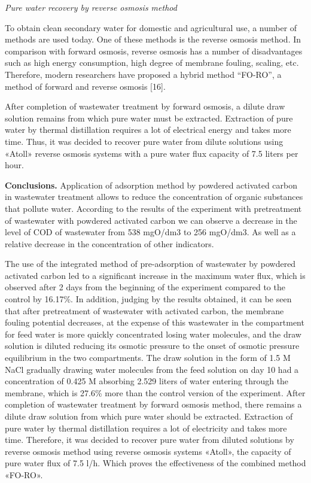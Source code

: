 \emph{Pure water recovery by reverse osmosis method}

To obtain clean secondary water for domestic and agricultural use, a
number of methods are used today. One of these methods is the reverse
osmosis method. In comparison with forward osmosis, reverse osmosis has
a number of disadvantages such as high energy consumption, high degree
of membrane fouling, scaling, etc. Therefore, modern researchers have
proposed a hybrid method ``FO-RO'', a method of forward and reverse
osmosis {[}16{]}.

After completion of wastewater treatment by forward osmosis, a dilute
draw solution remains from which pure water must be extracted.
Extraction of pure water by thermal distillation requires a lot of
electrical energy and takes more time. Thus, it was decided to recover
pure water from dilute solutions using «Atoll» reverse osmosis systems
with a pure water flux capacity of 7.5 liters per hour.

{\bfseries Conclusions.} Application of adsorption method by powdered
activated carbon in wastewater treatment allows to reduce the
concentration of organic substances that pollute water. According to the
results of the experiment with pretreatment of wastewater with powdered
activated carbon we can observe a decrease in the level of COD of
wastewater from 538 mgO/dm3 to 256 mgO/dm3. As well as a relative
decrease in the concentration of other indicators.

The use of the integrated method of pre-adsorption of wastewater by
powdered activated carbon led to a significant increase in the maximum
water flux, which is observed after 2 days from the beginning of the
experiment compared to the control by 16.17\%. In addition, judging by
the results obtained, it can be seen that after pretreatment of
wastewater with activated carbon, the membrane fouling potential
decreases, at the expense of this wastewater in the compartment for feed
water is more quickly concentrated losing water molecules, and the draw
solution is diluted reducing its osmotic pressure to the onset of
osmotic pressure equilibrium in the two compartments. The draw solution
in the form of 1.5 M NaCl gradually drawing water molecules from the
feed solution on day 10 had a concentration of 0.425 M absorbing 2.529
liters of water entering through the membrane, which is 27.6\% more than
the control version of the experiment. After completion of wastewater
treatment by forward osmosis method, there remains a dilute draw
solution from which pure water should be extracted. Extraction of pure
water by thermal distillation requires a lot of electricity and takes
more time. Therefore, it was decided to recover pure water from diluted
solutions by reverse osmosis method using reverse osmosis systems
«Atoll», the capacity of pure water flux of 7.5 l/h. Which proves the
effectiveness of the combined method «FO-RO».

